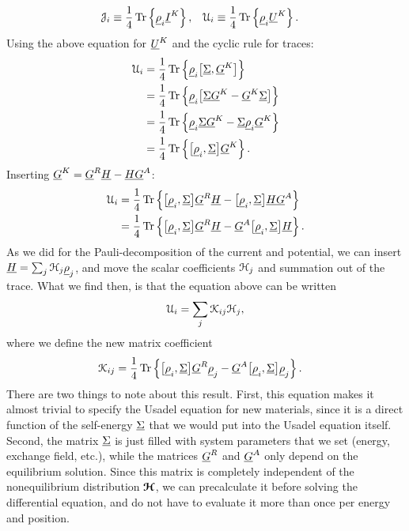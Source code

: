\begin{align}
  \mathcal{J}_i & \equiv \frac{1}{4} \operatorname{Tr}\left\{ {\underline{\rho}_i} {\underline{I}}^K \right\}, &
  \mathcal{U}_i & \equiv \frac{1}{4} \operatorname{Tr}\left\{ {\underline{\rho}_i} {\underline{U}}^K \right\}.
\end{align}
Using the above equation for ${\underline{U}}^K$ and the cyclic rule for traces:
\begin{align}
  \mathcal{U}_i 
  &= \frac{1}{4} \operatorname{Tr}\left\{ {\underline{\rho}_i} \big[ {\underline{\Sigma}}, {\underline{G}}^K\big] \right\} \\
  &= \frac{1}{4} \operatorname{Tr}\left\{ {\underline{\rho}_i} \big[ {\underline{\Sigma}} {\underline{G}}^K - {\underline{G}}^K {\underline{\Sigma}} \big] \right\} \\
  &= \frac{1}{4} \operatorname{Tr}\left\{ {\underline{\rho}_i} {\underline{\Sigma}} {\underline{G}}^K - {\underline{\Sigma}} {\underline{\rho}_i} {\underline{G}}^K \right\} \\
  &= \frac{1}{4} \operatorname{Tr}\left\{ \big[{\underline{\rho}_i}, {\underline{\Sigma}}\big] {\underline{G}}^K \right\}.
\end{align}
Inserting ${\underline{G}}^K = {\underline{G}}^R {\underline{H}} - {\underline{H}} {\underline{G}}^A$:
\begin{align}
  \mathcal{U}_i 
  &= \frac{1}{4} \operatorname{Tr}\left\{ \big[{\underline{\rho}_i}, {\underline{\Sigma}}\big] {\underline{G}}^R {\underline{H}} - \big[{\underline{\rho}_i}, {\underline{\Sigma}}\big] {\underline{H}} {\underline{G}}^A \right\} \\
  &= \frac{1}{4} \operatorname{Tr}\left\{ \big[{\underline{\rho}_i}, {\underline{\Sigma}}\big] {\underline{G}}^R {\underline{H}} - {\underline{G}}^A \big[{\underline{\rho}_i}, {\underline{\Sigma}}\big] {\underline{H}} \right\}.
\end{align}
As we did for the Pauli-decomposition of the current and potential, we can insert $\underline{H} = \sum_j \mathcal{H}_j {\underline{\rho}}_j$, and move the scalar coefficients $\mathcal{H}_j$ and summation out of the trace.
What we find then, is that the equation above can be written
\begin{align}
  \mathcal{U}_i = \sum_j \mathcal{K}_{ij} \mathcal{H}_j,
\end{align}
where we define the new matrix coefficient
\begin{align}
  \mathcal{K}_{ij}
  &= \frac{1}{4} \operatorname{Tr}\left\{ \big[{\underline{\rho}_i}, {\underline{\Sigma}}\big] {\underline{G}}^R {\underline{\rho}}_j - {\underline{G}}^A \big[{\underline{\rho}_i}, {\underline{\Sigma}}\big] {\underline{\rho}}_j \right\}.
\end{align}
There are two things to note about this result.
First, this equation makes it almost trivial to specify the Usadel equation for new materials, since it is a direct function of the self-energy $\underline{\Sigma}$ that we would put into the Usadel equation itself.
Second, the matrix $\underline{\Sigma}$ is just filled with system parameters that we set (energy, exchange field, etc.), while the matrices ${\underline{G}}^R$ and ${\underline{G}}^A$ only depend on the equilibrium solution.
Since this matrix is completely independent of the nonequilibrium distribution $\bm{\mathcal{H}}$, we can precalculate it before solving the differential equation, and do not have to evaluate it more than once per energy and position.



